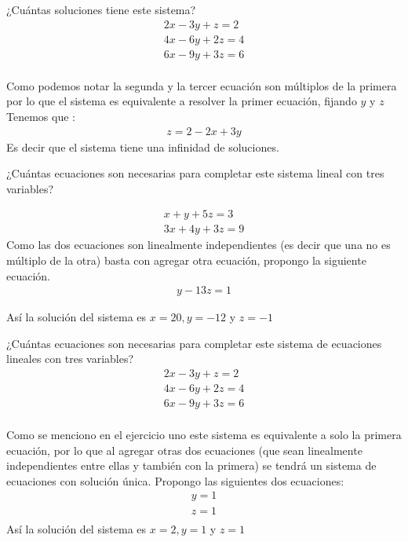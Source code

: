 \documentclass[paper=letter, fontsize=11pt]{scrartcl}
\numberwithin{equation}{section} %
\numberwithin{figure}{section} %
\numberwithin{table}{section} %
\newenvironment{cframed}[1][blue]
  {\begin{tcolorbox}[colframe=#1,colback=white]}
  {\end{tcolorbox}}
\begin{document}
\begin{enumerate}


\begin{cframed}[violet]
\item   ¿Cuántas soluciones tiene este sistema?\\
\[
\begin{split}
2x-3y+z=2 \\
4x-6y+2z=4\\
6x-9y+3z=6\\
\end{split}
\]
\end{cframed}
Como podemos notar la segunda y la tercer ecuación son múltiplos de la primera por lo que el sistema es equivalente a resolver la primer ecuación, fijando $y$ y $z$ 
Tenemos que :
\[
\begin{split}
z = 2-2x+3y
\end{split}
\]
Es decir que el sistema tiene una infinidad de soluciones.






\begin{cframed}[teal]
\item ¿Cuántas ecuaciones son necesarias para completar este sistema lineal con
tres variables?
\end{cframed}
\[
\begin{split}
x+y+5z=3\\
3x+4y+3z=9
\end{split}
\]
Como las dos ecuaciones son linealmente independientes (es decir que una no es múltiplo de la otra) basta con agregar otra ecuación, propongo la siguiente ecuación.
\[
\begin{split}
y-13z=1
\end{split}
\]

Así la solución del sistema es $x=20, y=-12$ y $z=-1$




\begin{cframed}[purple]

\item ¿Cuántas ecuaciones son necesarias para completar este sistema de ecuaciones lineales con tres variables?
\[
\begin{split}
2x-3y+z=2\\
4x-6y+2z=4\\
6x-9y+3z=6\\
\end{split}
\]
\end{cframed}
Como se menciono en el ejercicio uno este sistema es equivalente a solo la primera ecuación, por lo que al agregar otras dos ecuaciones (que sean linealmente independientes entre ellas y también con la primera) se tendrá un sistema de ecuaciones con solución única. Propongo las siguientes dos ecuaciones:
\[
\begin{split}
y=1\\
z=1\\
\end{split}
\]
Así la solución del sistema es $x = 2,y=1$ y $z=1$



\end{enumerate}
\end{document}
